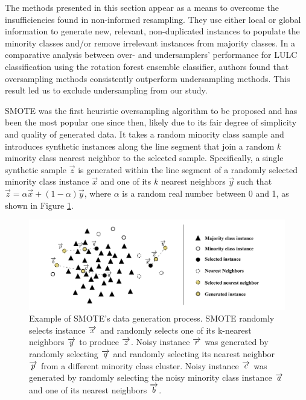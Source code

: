 \documentclass[authoryear,preprint,12pt]{elsarticle}
\begin{document}
\begin{linenumbers}
The methods presented in this section appear as a means to overcome the
insufficiencies found in non-informed resampling. They use either local or
global information to generate new, relevant, non-duplicated instances to
populate the minority classes and/or remove irrelevant instances from majority
classes. In a comparative analysis between over- and undersamplers' performance
for LULC classification \citep{Feng2018} using the rotation forest ensemble
classifier, authors found that oversampling methods consistently outperform
undersampling methods. This result led us to exclude undersampling from our
study.

SMOTE \citep{Chawla2002} was the first heuristic oversampling algorithm to be
proposed and has been the most popular one since then, likely due to its fair
degree of simplicity and quality of generated data. It takes a random minority
class sample and introduces synthetic instances along the line segment that
join a random $k$ minority class nearest neighbor to the selected sample.
Specifically, a single synthetic sample $\overrightarrow{z}$ is generated
within the line segment of a randomly selected minority class
instance $\overrightarrow{x}$ and one of its $k$ nearest
neighbors $\overrightarrow{y}$ such that $\overrightarrow{z} =
\alpha\overrightarrow{x}+(1-\alpha)\overrightarrow{y}$, where $\alpha$ is a
random real number between 0 and 1, as shown in
Figure \ref{fig:smote_example}.

\begin{figure}
	\centering
    \captionsetup{justification=centering}
    \caption{Example of SMOTE's data generation process. SMOTE randomly
        selects instance $\protect\overrightarrow{x}$ and randomly selects one
        of its k-nearest neighbors $\protect\overrightarrow{y}$ to produce
        $\protect\overrightarrow{z}$.  Noisy instance
        $\protect\overrightarrow{r}$ was generated by randomly selecting
        $\protect\overrightarrow{q}$ and randomly selecting its nearest
        neighbor $\protect\overrightarrow{p}$ from a different minority class
        cluster. Noisy instance $\protect\overrightarrow{c}$ was generated by
        randomly selecting the noisy minority class instance
        $\protect\overrightarrow{a}$ and one of its nearest neighbors
        $\protect\overrightarrow{b}$.
    \vspace{.2cm}}
	\label{fig:smote_example}
	\includegraphics[width=1\linewidth]{../analysis/smote_example}
\end{figure}


\end{linenumbers}
\end{document}
